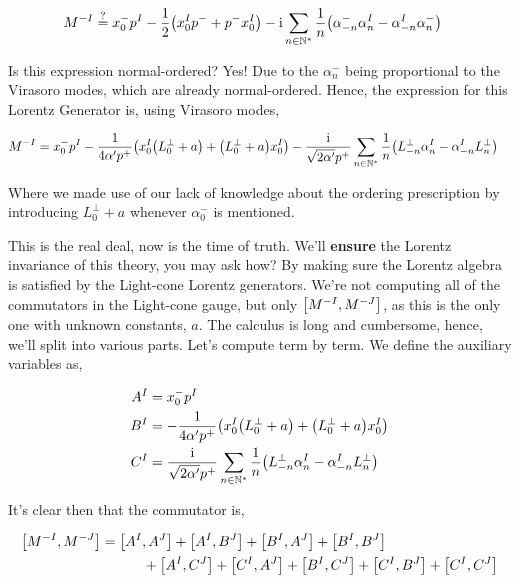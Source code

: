 \begin{align*}
    M^{-I}&\stackrel{?}{=}x_0^- p^I-\frac12\qty(x_0^I p^-+p^-x_0^I)-\textnormal{i}\sum\limits_{n\in\mathbb N^\ast}\frac{1}{n}\qty(\alpha^-_{-n}\alpha^I_{n}-\alpha^I_{-n}\alpha^-_{n})
\end{align*}

Is this expression normal-ordered? Yes! Due to the $\alpha_n^-$ being proportional to the Virasoro modes, which are already normal-ordered. Hence, the expression for this 
Lorentz Generator is, using Virasoro modes,

\begin{align*}
    M^{-I}&=x_0^- p^I-\frac{1}{4\alpha'p^+}\qty(x_0^I\qty(L_0^\perp+a)+\qty(L_0^\perp+a)x_0^I)-\frac{\textnormal{i}}{\sqrt{2\alpha'}p^+}\sum\limits_{n\in\mathbb N^\ast}\frac{1}{n}\qty(L^\perp_{-n}\alpha^I_{n}-\alpha^I_{-n}L^\perp_n)
\end{align*}

Where we made use of our lack of knowledge about the ordering prescription by introducing $L^\perp_0+a$ whenever $\alpha_0^-$ is mentioned.

\probitem{}

This is the real deal, now is the time of truth. We'll \textbf{ensure} the Lorentz invariance of this theory, you may ask how? 
By making sure the Lorentz algebra is satisfied by the Light-cone Lorentz generators. We're not computing all of the commutators in 
the Light-cone gauge, but only $\comm{M^{-I}}{M^{-J}}$, as this is the only one with unknown constants, $a$. The calculus is long and 
cumbersome, hence, we'll split into various parts. Let's compute term by term. We define the auxiliary variables as,

\begin{align*}
    A^I&=x_0^- p^I\\
    B^I&=-\frac{1}{4\alpha'p^+}\qty(x_0^I\qty(L_0^\perp+a)+\qty(L_0^\perp+a)x_0^I)\\
    C^I&=\frac{\textnormal{i}}{\sqrt{2\alpha'}p^+}\sum\limits_{n\in\mathbb N^\ast}\frac{1}{n}\qty(L^\perp_{-n}\alpha^I_{n}-\alpha^I_{-n}L^\perp_n)
\end{align*}

It's clear then that the commutator is,

\begin{align*}
    \comm{M^{-I}}{M^{-J}}&=\comm{A^I}{A^J}+\comm{A^I}{B^J}+\comm{B^I}{A^J}+\comm{B^I}{B^J}\\
    &\quad\quad\quad+\comm{A^I}{C^J}+\comm{C^I}{A^J}+\comm{B^I}{C^J}+\comm{C^I}{B^J}+\comm{C^I}{C^J}
\end{align*}

